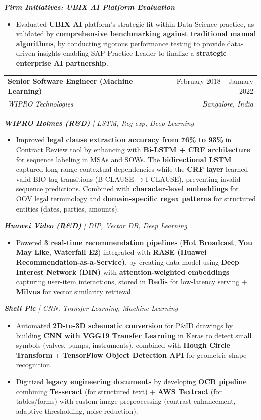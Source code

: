 \documentclass[letterpaper,10pt]{article}
\makeatletter
\newcommand{\resumeItem}[1]{
  \item\small{
    {#1 \vspace{-2pt}}
  }
}
\newcommand{\resumeSubheading}[4]{
  \vspace{-2pt}\item
    \begin{tabular*}{0.97\textwidth}[t]{l@{\extracolsep{\fill}}r}
      \textbf{#1} & #2 \\
      \textit{\small#3} & \textit{\small #4} \\
    \end{tabular*}\vspace{-7pt}
}
\newcommand{\resumeItemListStart}{\begin{itemize}}
\newcommand{\resumeItemListEnd}{\end{itemize}\vspace{-5pt}}
\makeatother
\begin{document}
      \vspace{12pt}
      \textit{\small\textbf{Firm Initiatives: UBIX AI Platform Evaluation}}
      \resumeItemListStart
        \resumeItem{Evaluated \textbf{UBIX AI} platform's strategic fit within Data Science practice, as validated by \textbf{comprehensive benchmarking against traditional manual algorithms}, by conducting rigorous performance testing to provide data-driven insights enabling SAP Practice Leader to finalize a \textbf{strategic enterprise AI partnership}.}
      \resumeItemListEnd

      \vspace{12pt}
      \vspace{12pt}
    \resumeSubheading
      {Senior Software Engineer (Machine Learning)}{February 2018 -- January 2022}
      {WIPRO Technologies}{Bangalore, India}
      
      \vspace{12pt}
      \textit{\small\textbf{WIPRO Holmes (R\&D)} | LSTM, Reg-exp, Deep Learning}
      \resumeItemListStart
        \resumeItem{Improved \textbf{legal clause extraction accuracy from 76\% to 93\%} in Contract Review tool by enhancing with \textbf{Bi-LSTM + CRF architecture} for sequence labeling in MSAs and SOWs. The \textbf{bidirectional LSTM} captured long-range contextual dependencies while the \textbf{CRF layer} learned valid BIO tag transitions (B-CLAUSE → I-CLAUSE), preventing invalid sequence predictions. Combined with \textbf{character-level embeddings} for OOV legal terminology and \textbf{domain-specific regex patterns} for structured entities (dates, parties, amounts).}
        \resumeItemListEnd

      \vspace{12pt}
      \textit{\small\textbf{Huawei Video (R\&D)} | DIP, Vector DB, Deep Learning}
      \resumeItemListStart
        \resumeItem{Powered \textbf{3 real-time recommendation pipelines} (\textbf{Hot Broadcast}, \textbf{You May Like}, \textbf{Waterfall E2}) integrated with \textbf{RASE (Huawei Recommendation-as-a-Service)}, by creating data model using \textbf{Deep Interest Network (DIN)} with \textbf{attention-weighted embeddings} capturing user-item interactions, stored in \textbf{Redis} for low-latency serving + \textbf{Milvus} for vector similarity retrieval.}
        \resumeItemListEnd
        
      \vspace{12pt}
      \textit{\small\textbf{Shell Plc} | CNN, Transfer Learning, Machine Learning}
      \resumeItemListStart
        \resumeItem{Automated \textbf{2D-to-3D schematic conversion} for P\&ID drawings by building \textbf{CNN with VGG19 Transfer Learning} in Keras to detect small symbols (valves, pumps, instruments), combined with \textbf{Hough Circle Transform} + \textbf{TensorFlow Object Detection API} for geometric shape recognition.}
        \resumeItem{Digitized \textbf{legacy engineering documents} by developing \textbf{OCR pipeline} combining \textbf{Tesseract} (for structured text) + \textbf{AWS Textract} (for tables/forms) with custom image preprocessing (contrast enhancement, adaptive thresholding, noise reduction).}
      \resumeItemListEnd
\end{document}
